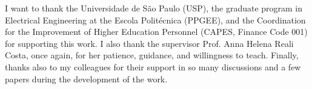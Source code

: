\documentclass[]{politex-xico}
\begin{document}
\capa
\falsafolhaderosto
\folhaderosto




%




\begin{agradecimentos}
I want to thank the Universidade de São Paulo (USP), the graduate program in Electrical Engineering at the Escola Politécnica (PPGEE), and the Coordination for the Improvement of Higher Education Personnel (CAPES, Finance Code 001) for supporting this work. I also thank the supervisor Prof. Anna Helena Reali Costa, once again, for her patience, guidance, and willingness to teach. Finally, thanks also to my colleagues for their support in so many discussions and a few papers during the development of the work.

\end{agradecimentos}


\end{document}

